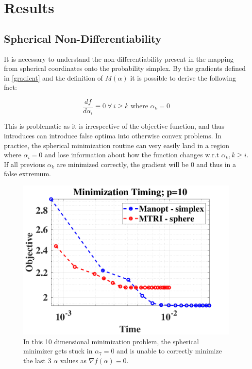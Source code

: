 \documentclass[10pt]{article}
\begin{document}
\newpage 
\section{Results}

\subsection{Spherical Non-Differentiability}

It is necessary to understand the non-differentiability present in the mapping from spherical coordinates onto the probability simplex. By the gradients defined in \eqref{gradient} and the definition of $M(\alpha)$ it is possible to derive the following fact:

\[ \frac{df}{d\alpha_i} \equiv 0 \ \forall \ i \geq k \text{ where } \alpha_k = 0\]

This is problematic as it is irrespective of the objective function, and thus introduces can introduce false optima into otherwise convex problems. In practice, the spherical minimization routine can very easily land in a region where $\alpha_i = 0$ and lose information about how the function changes w.r.t $\alpha_k, k \geq i$. If all previous $\alpha_k$ are minimized correctly, the gradient will be 0 and thus in a false extremum. 


\begin{figure}[h]
	\centering
	\includegraphics[scale = 0.4]{stuckSphericalMin.pdf}
	\caption{In this 10 dimensional minimization problem, the spherical minimizer gets stuck in $\alpha_7 = 0$ and is unable to correctly minimize the last 3 $\alpha$ values as $\nabla f(\alpha) \equiv 0$.}
\end{figure}
\end{document}
